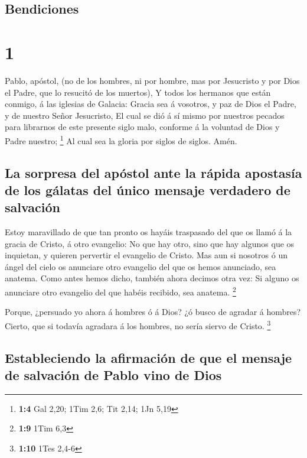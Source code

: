 \hypertarget{bendiciones}{%
\subsection{Bendiciones}\label{bendiciones}}

\hypertarget{section}{%
\section{1}\label{section}}

 Pablo, apóstol, (no de los hombres, ni por hombre, mas
por Jesucristo y por Dios el Padre, que lo resucitó de los muertos),
 Y todos los hermanos que están conmigo, á las iglesias de
Galacia:  Gracia sea á vosotros, y paz de Dios el Padre, y
de nuestro Señor Jesucristo,  El cual se dió á sí mismo
por nuestros pecados para librarnos de este presente siglo malo,
conforme á la voluntad de Dios y Padre nuestro; \footnote{\textbf{1:4}
  Gal 2,20; 1Tim 2,6; Tit 2,14; 1Jn 5,19}  Al cual sea la
gloria por siglos de siglos. Amén.

\hypertarget{la-sorpresa-del-apuxf3stol-ante-la-ruxe1pida-apostasuxeda-de-los-guxe1latas-del-uxfanico-mensaje-verdadero-de-salvaciuxf3n}{%
\subsection{La sorpresa del apóstol ante la rápida apostasía de los
gálatas del único mensaje verdadero de
salvación}\label{la-sorpresa-del-apuxf3stol-ante-la-ruxe1pida-apostasuxeda-de-los-guxe1latas-del-uxfanico-mensaje-verdadero-de-salvaciuxf3n}}

 Estoy maravillado de que tan pronto os hayáis traspasado
del que os llamó á la gracia de Cristo, á otro evangelio: 
No que hay otro, sino que hay algunos que os inquietan, y quieren
pervertir el evangelio de Cristo.  Mas aun si nosotros ó
un ángel del cielo os anunciare otro evangelio del que os hemos
anunciado, sea anatema.  Como antes hemos dicho, también
ahora decimos otra vez: Si alguno os anunciare otro evangelio del que
habéis recibido, sea anatema. \footnote{\textbf{1:9} 1Tim 6,3}

 Porque, ¿persuado yo ahora á hombres ó á Dios? ¿ó busco
de agradar á hombres? Cierto, que si todavía agradara á los hombres, no
sería siervo de Cristo. \footnote{\textbf{1:10} 1Tes 2,4-6}

\hypertarget{estableciendo-la-afirmaciuxf3n-de-que-el-mensaje-de-salvaciuxf3n-de-pablo-vino-de-dios}{%
\subsection{Estableciendo la afirmación de que el mensaje de salvación
de Pablo vino de
Dios}\label{estableciendo-la-afirmaciuxf3n-de-que-el-mensaje-de-salvaciuxf3n-de-pablo-vino-de-dios}}

